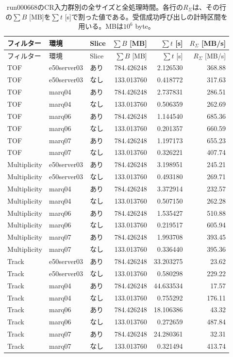 \begin{longtable}{lllrrr}
 \caption{run000668のCR入力群別の全サイズと全処理時間。各行の$R_\Sigma$は、その行の$\sum B$ [MB]を$\sum t$ [s]で割った値である。受信成功呼び出しの計時区間を用いる。MBは$10^6$ byte。}\\
 \hline
 フィルター & 環境 & Slice & $\sum B$ [MB] & $\sum t$ [s] & $R_\Sigma$ [MB/s] \\ \hline
 \endfirsthead
 \hline
 フィルター & 環境 & Slice & $\sum B$ [MB] & $\sum t$ [s] & $R_\Sigma$ [MB/s] \\ \hline
 \endhead
 TOF & e50server03 & あり & 784.426248 & 2.126530 & 368.88 \\
 TOF & e50server03 & なし & 133.013760 & 0.418772 & 317.63 \\
 TOF & marq04 & あり & 784.426248 & 2.737831 & 286.51 \\
 TOF & marq04 & なし & 133.013760 & 0.506359 & 262.69 \\
 TOF & marq06 & あり & 784.426248 & 1.144540 & 685.36 \\
 TOF & marq06 & なし & 133.013760 & 0.201357 & 660.59 \\
 TOF & marq07 & あり & 784.426248 & 1.197173 & 655.23 \\
 TOF & marq07 & なし & 133.013760 & 0.326221 & 407.74 \\
 Multiplicity & e50server03 & あり & 784.426248 & 3.198951 & 245.21 \\
 Multiplicity & e50server03 & なし & 133.013760 & 0.493180 & 269.71 \\
 Multiplicity & marq04 & あり & 784.426248 & 3.372914 & 232.57 \\
 Multiplicity & marq04 & なし & 133.013760 & 0.507150 & 262.28 \\
 Multiplicity & marq06 & あり & 784.426248 & 1.535427 & 510.88 \\
 Multiplicity & marq06 & なし & 133.013760 & 0.219517 & 605.94 \\
 Multiplicity & marq07 & あり & 784.426248 & 1.993708 & 393.45 \\
 Multiplicity & marq07 & なし & 133.013760 & 0.336440 & 395.36 \\
 Track & e50server03 & あり & 784.426248 & 33.203275 & 23.62 \\
 Track & e50server03 & なし & 133.013760 & 0.580298 & 229.22 \\
 Track & marq04 & あり & 784.426248 & 44.633534 & 17.57 \\
 Track & marq04 & なし & 133.013760 & 0.755292 & 176.11 \\
 Track & marq06 & あり & 784.426248 & 18.106386 & 43.32 \\
 Track & marq06 & なし & 133.013760 & 0.272659 & 487.84 \\
 Track & marq07 & あり & 784.426248 & 24.280361 & 32.31 \\
 Track & marq07 & なし & 133.013760 & 0.321494 & 413.74 \\
 \hline
\end{longtable}
